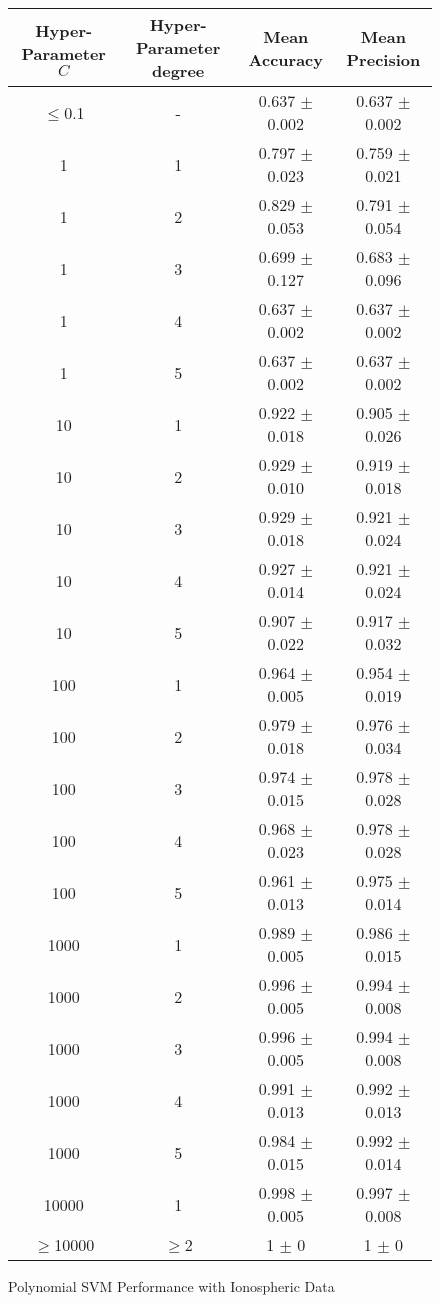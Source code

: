 \documentclass[tikz]{article}
\begin{document}
\begin{figure}[H]
\centering
\begin{tabular}{|c|c|c|c|}
\hline
Hyper-Parameter $C$ & Hyper-Parameter degree & Mean Accuracy & Mean Precision \\
\hline
$\leq$0.1 & - & 0.637 $\pm$ 0.002 & 0.637 $\pm$ 0.002 \\
\hline
1 & 1 & 0.797 $\pm$ 0.023 & 0.759 $\pm$ 0.021 \\
\hline
1 & 2 & 0.829 $\pm$ 0.053 & 0.791 $\pm$ 0.054 \\
\hline
1 & 3 & 0.699 $\pm$ 0.127 & 0.683 $\pm$ 0.096 \\
\hline
1 & 4 & 0.637 $\pm$ 0.002 & 0.637 $\pm$ 0.002 \\
\hline
1 & 5 & 0.637 $\pm$ 0.002 & 0.637 $\pm$ 0.002 \\
\hline
10 & 1 & 0.922 $\pm$ 0.018 & 0.905 $\pm$ 0.026 \\
\hline
10 & 2 & 0.929 $\pm$ 0.010 & 0.919 $\pm$ 0.018 \\
\hline
10 & 3 & 0.929 $\pm$ 0.018 & 0.921 $\pm$ 0.024 \\
\hline
10 & 4 & 0.927 $\pm$ 0.014 & 0.921 $\pm$ 0.024 \\
\hline
10 & 5 & 0.907 $\pm$ 0.022 & 0.917 $\pm$ 0.032 \\
\hline
100 & 1 & 0.964 $\pm$ 0.005 & 0.954 $\pm$ 0.019 \\
\hline
100 & 2 & 0.979 $\pm$ 0.018 & 0.976 $\pm$ 0.034 \\
\hline
100 & 3 & 0.974 $\pm$ 0.015 & 0.978 $\pm$ 0.028 \\
\hline
100 & 4 & 0.968 $\pm$ 0.023 & 0.978 $\pm$ 0.028 \\
\hline
100 & 5 & 0.961 $\pm$ 0.013 & 0.975 $\pm$ 0.014 \\
\hline
1000 & 1 & 0.989 $\pm$ 0.005 & 0.986 $\pm$ 0.015 \\
\hline
1000 & 2 & 0.996 $\pm$ 0.005 & 0.994 $\pm$ 0.008 \\
\hline
1000 & 3 & 0.996 $\pm$ 0.005 & 0.994 $\pm$ 0.008 \\
\hline
1000 & 4 & 0.991 $\pm$ 0.013 & 0.992 $\pm$ 0.013 \\
\hline
1000 & 5 & 0.984 $\pm$ 0.015 & 0.992 $\pm$ 0.014 \\
\hline
10000 & 1 & 0.998 $\pm$ 0.005 & 0.997 $\pm$ 0.008 \\
\hline
$\geq$10000 & $\geq$2 & 1 $\pm$ 0 & 1 $\pm$ 0  \\
\hline
\end{tabular}
\caption{Polynomial SVM Performance with Ionospheric Data}
\label{fig:ion_poly_1}
\end{figure}
\end{document}
